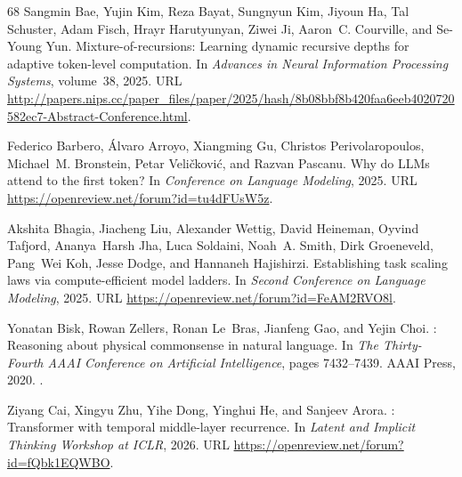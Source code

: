 \documentclass[]{bytedance_seed}
\theoremstyle{definition}
\theoremstyle{remark}
\begin{document}
\begin{thebibliography}{68}
Sangmin Bae, Yujin Kim, Reza Bayat, Sungnyun Kim, Jiyoun Ha, Tal Schuster, Adam
  Fisch, Hrayr Harutyunyan, Ziwei Ji, Aaron~C. Courville, and Se-Young Yun.
\newblock Mixture-of-recursions: Learning dynamic recursive depths for adaptive
  token-level computation.
\newblock In \emph{Advances in Neural Information Processing Systems},
  volume~38, 2025{}.
\newblock URL
  \url{http://papers.nips.cc/paper_files/paper/2025/hash/8b08bbf8b420faa6eeb4020720582ec7-Abstract-Conference.html}.

Federico Barbero, {\'A}lvaro Arroyo, Xiangming Gu, Christos Perivolaropoulos,
  Michael~M. Bronstein, Petar Veli{\v{c}}kovi{\'c}, and Razvan Pascanu.
\newblock Why do {LLMs} attend to the first token?
\newblock In \emph{Conference on Language Modeling}, 2025.
\newblock URL \url{https://openreview.net/forum?id=tu4dFUsW5z}.

Akshita Bhagia, Jiacheng Liu, Alexander Wettig, David Heineman, Oyvind Tafjord,
  Ananya~Harsh Jha, Luca Soldaini, Noah~A. Smith, Dirk Groeneveld, Pang~Wei
  Koh, Jesse Dodge, and Hannaneh Hajishirzi.
\newblock Establishing task scaling laws via compute-efficient model ladders.
\newblock In \emph{Second Conference on Language Modeling}, 2025.
\newblock URL \url{https://openreview.net/forum?id=FeAM2RVO8l}.

Yonatan Bisk, Rowan Zellers, Ronan Le~Bras, Jianfeng Gao, and Yejin Choi.
: Reasoning about physical commonsense in natural language.
\newblock In \emph{The Thirty-Fourth AAAI Conference on Artificial
  Intelligence}, pages 7432--7439. {AAAI} Press, 2020.
\newblock {}.

Ziyang Cai, Xingyu Zhu, Yihe Dong, Yinghui He, and Sanjeev Arora.
: Transformer with temporal middle-layer recurrence.
\newblock In \emph{Latent and Implicit Thinking Workshop at ICLR}, 2026.
\newblock URL \url{https://openreview.net/forum?id=fQbk1EQWBO}.


\end{thebibliography}
\end{document}
